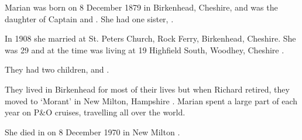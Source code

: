 
Marian was born on 8 December 1879 in  Birkenhead, Cheshire,  and was the daughter of Captain  and .
She had one sister, .

In 1908 she married  at St. Peters Church, Rock Ferry, Birkenhead, Cheshire.
She was 29 and at the time was living at 19 Highfield South, Woodhey, Cheshire \cite{MarianCroskeryMarriage}.

They had two children,  and .

They lived in Birkenhead for most of their lives but when Richard retired, they moved to `Morant' in New Milton, Hampshire \cite{MarianCroskeryResidence}.
Marian spent a large part of each year on P\&O cruises, travelling all over the world.

She died in on 8 December 1970 in New Milton \cite{MarianCroskeryDeath}.
